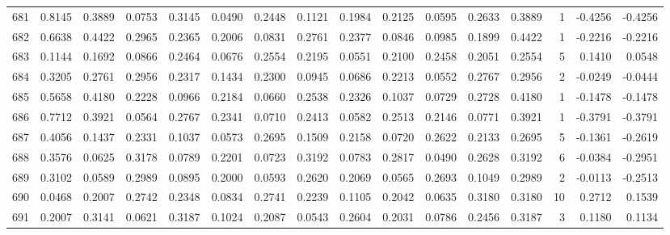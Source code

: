 \begin{tabular}{lrrrrrrrrrrrrrrr}
681 &      0.8145 &  0.3889 &  0.0753 &  0.3145 &  0.0490 &  0.2448 &  0.1121 &  0.1984 &  0.2125 &  0.0595 &   0.2633 &     0.3889 &      1 &                   -0.4256 &                    -0.4256 \\
682 &      0.6638 &  0.4422 &  0.2965 &  0.2365 &  0.2006 &  0.0831 &  0.2761 &  0.2377 &  0.0846 &  0.0985 &   0.1899 &     0.4422 &      1 &                   -0.2216 &                    -0.2216 \\
683 &      0.1144 &  0.1692 &  0.0866 &  0.2464 &  0.0676 &  0.2554 &  0.2195 &  0.0551 &  0.2100 &  0.2458 &   0.2051 &     0.2554 &      5 &                    0.1410 &                     0.0548 \\
684 &      0.3205 &  0.2761 &  0.2956 &  0.2317 &  0.1434 &  0.2300 &  0.0945 &  0.0686 &  0.2213 &  0.0552 &   0.2767 &     0.2956 &      2 &                   -0.0249 &                    -0.0444 \\
685 &      0.5658 &  0.4180 &  0.2228 &  0.0966 &  0.2184 &  0.0660 &  0.2538 &  0.2326 &  0.1037 &  0.0729 &   0.2728 &     0.4180 &      1 &                   -0.1478 &                    -0.1478 \\
686 &      0.7712 &  0.3921 &  0.0564 &  0.2767 &  0.2341 &  0.0710 &  0.2413 &  0.0582 &  0.2513 &  0.2146 &   0.0771 &     0.3921 &      1 &                   -0.3791 &                    -0.3791 \\
687 &      0.4056 &  0.1437 &  0.2331 &  0.1037 &  0.0573 &  0.2695 &  0.1509 &  0.2158 &  0.0720 &  0.2622 &   0.2133 &     0.2695 &      5 &                   -0.1361 &                    -0.2619 \\
688 &      0.3576 &  0.0625 &  0.3178 &  0.0789 &  0.2201 &  0.0723 &  0.3192 &  0.0783 &  0.2817 &  0.0490 &   0.2628 &     0.3192 &      6 &                   -0.0384 &                    -0.2951 \\
689 &      0.3102 &  0.0589 &  0.2989 &  0.0895 &  0.2000 &  0.0593 &  0.2620 &  0.2069 &  0.0565 &  0.2693 &   0.1049 &     0.2989 &      2 &                   -0.0113 &                    -0.2513 \\
690 &      0.0468 &  0.2007 &  0.2742 &  0.2348 &  0.0834 &  0.2741 &  0.2239 &  0.1105 &  0.2042 &  0.0635 &   0.3180 &     0.3180 &     10 &                    0.2712 &                     0.1539 \\
691 &      0.2007 &  0.3141 &  0.0621 &  0.3187 &  0.1024 &  0.2087 &  0.0543 &  0.2604 &  0.2031 &  0.0786 &   0.2456 &     0.3187 &      3 &                    0.1180 &                     0.1134 \\

\end{tabular}
